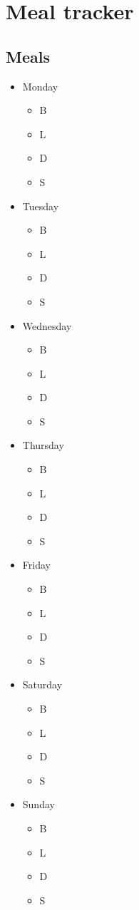 \documentclass[a4paper]{article}
\begin{document}
\section{Meal tracker}
\subsection{Meals}
\begin{itemize}
  \item Monday
		\begin{itemize}
     \item B
     \item L
     \item D
     \item S
     \end{itemize}
  \item Tuesday
		\begin{itemize}
     \item B
     \item L
     \item D
     \item S
     \end{itemize}
  \item Wednesday
		\begin{itemize}
     \item B
     \item L
     \item D
     \item S
     \end{itemize}
	\item Thursday
		\begin{itemize}
     \item B
     \item L
     \item D
     \item S
     \end{itemize}
	\item Friday
		\begin{itemize}
     \item B
     \item L
     \item D
     \item S
     \end{itemize}
	\item Saturday
		\begin{itemize}
     \item B
     \item L
     \item D
     \item S
     \end{itemize}
	\item	Sunday
		\begin{itemize}
     \item B
     \item L
     \item D
     \item S
     \end{itemize}
\end{itemize}
\end{document}
